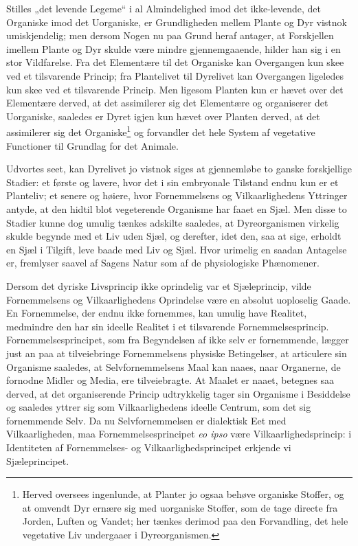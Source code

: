\documentclass[11pt]{book}
\newcommand{\opage}[1]{\marginnote{\footnotesize\textit{[#1]}}}
\begin{document}
Stilles „det levende Legeme“ i al Almindelighed imod det ikke-levende, det
Organiske imod det Uorganiske, er Grundligheden mellem Plante og Dyr vistnok
umiskjendelig; men dersom Nogen nu paa Grund heraf antager, at Forskjellen
imellem Plante og Dyr skulde være mindre gjennemgaaende, hilder han sig i en
stor Vildfarelse. Fra det Elementære til det Organiske kan Overgangen kun
skee ved et tilsvarende Princip; fra Plantelivet til Dyrelivet kan Overgangen
ligeledes kun skee ved et tilsvarende Princip. Men ligesom Planten kun er
hævet over det Elementære derved, at det assimilerer sig det Elementære og
organiserer det Uorganiske, saaledes er Dyret igjen kun hævet over Planten
derved, at det assimilerer sig det Organiske\footnote{%
Herved oversees ingenlunde, at Planter jo ogsaa behøve organiske Stoffer, og
at omvendt Dyr ernære sig med uorganiske Stoffer, som de tage directe fra
Jorden, Luften og Vandet; her tænkes derimod paa den Forvandling, det hele
vegetative Liv undergaaer i Dyreorganismen.} og forvandler det hele System af
vegetative Functioner til Grundlag for det Animale.

Udvortes seet, kan Dyrelivet jo vistnok siges at gjennemløbe to ganske
forskjellige Stadier: et første og lavere, hvor det i sin embryonale Tilstand
endnu kun er et Planteliv; et senere og høiere, hvor Fornemmelsens og
Vilkaarlighedens Yttringer antyde, at den hidtil blot vegeterende Organisme
har faaet en Sjæl. Men disse to Stadier kunne dog umulig tænkes adskilte
saaledes, at Dyreorganismen virkelig skulde begynde med et Liv uden Sjæl, og
derefter, idet den, saa at sige, erholdt en Sjæl i Tilgift, leve baade
\opage{342} \setcounter{footnote}{0}%
med Liv og Sjæl. Hvor urimelig en saadan Antagelse er, fremlyser
saavel af Sagens Natur som af de physiologiske Phænomener.

Dersom det dyriske Livsprincip ikke oprindelig var et Sjæleprincip,
vilde Fornemmelsens og Vilkaarlighedens Oprindelse være en absolut
uoploselig Gaade.%
 En Fornemmelse, der endnu ikke fornemmes, kan umulig
have Realitet, medmindre den har sin ideelle Realitet i et tilsvarende
Fornemmelsesprincip. Fornemmelsesprincipet, som fra Begyndelsen af
ikke selv er fornemmende, lægger just an paa at tilveiebringe
Fornemmelsens physiske Betingelser, at articulere sin Organisme saaledes,
at Selvfornemmelsens Maal kan naaes, naar Organerne, de fornodne
Midler og Media, ere tilveiebragte. At Maalet er naaet, betegnes saa
derved, at det organiserende Princip udtrykkelig tager sin Organisme i
Besiddelse og saaledes yttrer sig som Vilkaarlighedens ideelle Centrum,
som det sig fornemmende Selv. Da nu Selvfornemmelsen er dialektisk
Eet med Vilkaarligheden, maa Fornemmelsesprincipet \textit{eo ipso} være
Vilkaarlighedsprincip: i Identiteten af Fornemmelses- og
Vilkaarlighedsprincipet erkjende vi Sjæleprincipet.
\end{document}
